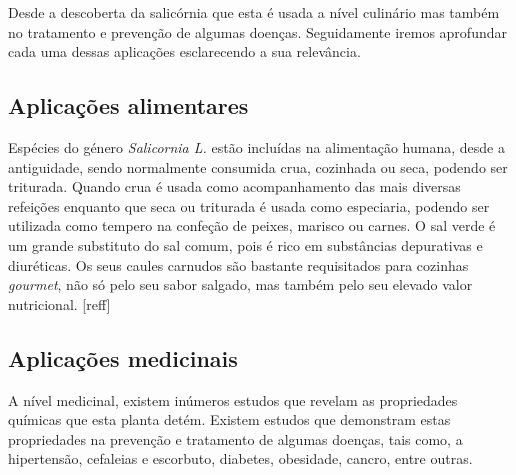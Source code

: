 Desde a descoberta da salicórnia que esta é usada a nível culinário mas também no tratamento e prevenção de algumas doenças. Seguidamente iremos aprofundar cada uma dessas aplicações esclarecendo a sua relevância. 



\subsection{Aplicações alimentares}


Espécies do género \textit{Salicornia L.} estão incluídas na alimentação humana, desde a antiguidade, sendo normalmente consumida crua, cozinhada ou seca, podendo ser triturada. Quando crua é usada como acompanhamento das mais diversas refeições enquanto que seca ou triturada é usada como especiaria, podendo ser utilizada como tempero na confeção de peixes, marisco ou carnes. O sal verde é um grande substituto do sal comum, pois é rico em substâncias depurativas e diuréticas. Os seus caules carnudos são bastante requisitados para cozinhas \textit{gourmet}, não só pelo seu sabor salgado, mas também pelo seu elevado valor nutricional.  [reff]


 







\subsection{Aplicações medicinais}


A nível medicinal, existem inúmeros estudos que revelam as propriedades químicas que esta planta detém. Existem estudos que demonstram estas propriedades na prevenção e tratamento de algumas doenças, tais como, a hipertensão, cefaleias e escorbuto, diabetes, obesidade, cancro, entre outras.


